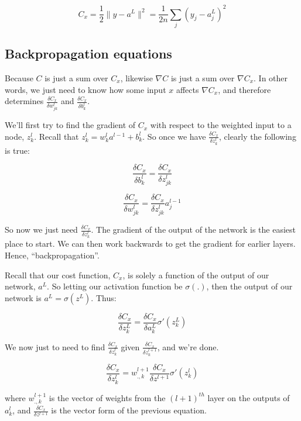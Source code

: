 \documentclass[12pt]{article}
\begin{document}
$$C_x = \frac{1}{2}\| y - a^L \|^2  = \frac{1}{2n}\sum_j (y_j - a^L_j)^2$$

\subsection*{Backpropagation equations}

Because $C$ is just a sum over $C_x$, likewise $\nabla C$ is just a sum over $\nabla C_x$. In other words, we just need to know how some input $x$ affects $\nabla C_x$, and therefore determines $\frac{\delta C_x}{\delta w^l_{jk}}$ and $\frac{\delta C_x}{\delta b^l_k}$.

We'll first try to find the gradient of $C_x$ with respect to the weighted input to a node, $z^l_{k}$. Recall that $z^l_{k} = w^l_{k} a^{l-1} + b^l_k$. So once we have $\frac{\delta C_x}{\delta z^l_{k}}$, clearly the following is true:

\begin{equation}
\frac{\delta C_x}{\delta b^l_{k}} = \frac{\delta C_x}{\delta z^l_{jk}}
\end{equation}

\begin{equation}
\frac{\delta C_x}{\delta w^l_{jk}} = \frac{\delta C_x}{\delta z^l_{jk}}a^{l-1}_{j}
\end{equation}

So now we just need $\frac{\delta C_x}{\delta z^l_{k}}$. The gradient of the output of the network is the easiest place to start. We can then work backwards to get the gradient for earlier layers. Hence, ``backpropagation''.

Recall that our cost function, $C_x$, is solely a function of the output of our network, $a^L$. So letting our activation function be $\sigma(.)$, then the output of our network is $a^L = \sigma(z^L)$. Thus:

\begin{equation}
\frac{\delta C_x}{\delta z^L_k} = \frac{\delta C_x}{\delta a^L_k} \sigma'(z^L_k)
\end{equation}

We now just to need to find $\frac{\delta C_x}{\delta z^{l}_k}$ given $\frac{\delta C_x}{\delta z^{l+1}_k}$, and we're done.

\begin{equation}
\frac{\delta C_x}{\delta z^l_k} = w^{l+1}_{.,k}\frac{\delta C_x}{\delta z^{l+1}} \sigma'(z^l_k)
\end{equation}

where $w^{l+1}_{.,k}$ is the vector of weights from the $(l+1)^{th}$ layer on the outputs of $a^l_k$, and $\frac{\delta C_x}{\delta z^{l+1}}$ is the vector form of the previous equation.
\end{document}
